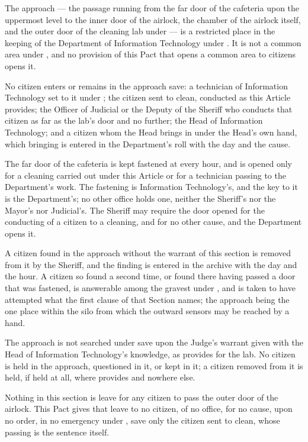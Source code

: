 \begin{clauses}
\item The approach --- the passage running from the far door of the cafeteria upon the uppermost level to the inner door of the airlock, the chamber of the airlock itself, and the outer door of the cleaning lab under  --- is a restricted place in the keeping of the Department of Information Technology under . It is not a common area under , and no provision of this Pact that opens a common area to citizens opens it.
\item No citizen enters or remains in the approach save: a technician of Information Technology set to it under ; the citizen sent to clean, conducted as this Article provides; the Officer of Judicial or the Deputy of the Sheriff who conducts that citizen as far as the lab's door and no further; the Head of Information Technology; and a citizen whom the Head brings in under the Head's own hand, which bringing is entered in the Department's roll with the day and the cause.
\item The far door of the cafeteria is kept fastened at every hour, and is opened only for a cleaning carried out under this Article or for a technician passing to the Department's work. The fastening is Information Technology's, and the key to it is the Department's; no other office holds one, neither the Sheriff's nor the Mayor's nor Judicial's. The Sheriff may require the door opened for the conducting of a citizen to a cleaning, and for no other cause, and the Department opens it.
\item A citizen found in the approach without the warrant of this section is removed from it by the Sheriff, and the finding is entered in the archive with the day and the hour. A citizen so found a second time, or found there having passed a door that was fastened, is answerable among the gravest under , and is taken to have attempted what the first clause of that Section names; the approach being the one place within the silo from which the outward sensors may be reached by a hand.
\item The approach is not searched under  save upon the Judge's warrant given with the Head of Information Technology's knowledge, as  provides for the lab. No citizen is held in the approach, questioned in it, or kept in it; a citizen removed from it is held, if held at all, where  provides and nowhere else.
\item Nothing in this section is leave for any citizen to pass the outer door of the airlock. This Pact gives that leave to no citizen, of no office, for no cause, upon no order, in no emergency under , save only the citizen sent to clean, whose passing is the sentence itself.
\end{clauses}
